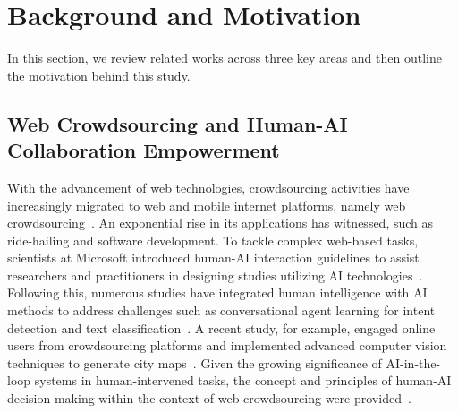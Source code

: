 \section{Background and Motivation}
In this section, we review related works across three key areas and then outline the motivation behind this study.

\subsection{Web Crowdsourcing and Human-AI Collaboration Empowerment}
With the advancement of web technologies, crowdsourcing activities have increasingly migrated to web and mobile internet platforms, namely web crowdsourcing~\cite{doan2011crowdsourcing}. An exponential rise in its applications has witnessed, such as ride-hailing and software development.
To tackle complex web-based tasks, scientists at Microsoft introduced human-AI interaction guidelines to assist researchers and practitioners in designing studies utilizing AI technologies~\cite{amershi2019guidelines}. Following this, numerous studies have integrated human intelligence with AI methods to address challenges such as conversational agent learning for intent detection and text classification~\cite{yang2018leveraging,arous2021marta}. A recent study, for example, engaged online users from crowdsourcing platforms and implemented advanced computer vision techniques to generate city maps~\cite{qiu2019crowd}. Given the growing significance of AI-in-the-loop systems in human-intervened tasks, the concept and principles of human-AI decision-making within the context of web crowdsourcing were provided~\cite{green2019principles}. 


